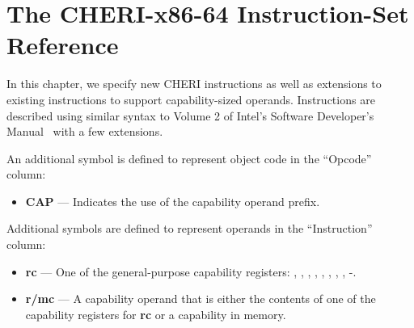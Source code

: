 \chapter{The CHERI-x86-64 Instruction-Set Reference}
\label{chap:isaref-x86-64}


\newenvironment{x86opcodetable}{%
  \tabularx{\textwidth}{| l | l | p{2.0em} | p{2.5em} | p{2.5em} | Z |} \hline
    \textbf{Opcode} & \textbf{Instruction} & \textbf{Op/ En} &
    \textbf{Cap Mode} & \textbf{64-bit Mode} & \textbf{Description}\\
    \hline
}{%
  \endtabularx
}

\newcommand{\xopcode}[6]{%
  #1 & #2 & #3 & #4 & #5 & #6\\
  \hline
}

\newenvironment{x86opentable}{%
  \bigskip
  \noindent
  \tabularx{\textwidth}{| c | Y | Y | Y | Y |}
    \multicolumn{5}{c}{\bfseries Instruction Operand Encoding}\\
    \hline
    Op/En & Operand 1 & Operand 2 & Operand 3 & Operand 4\\
    \hline
}{%
  \endtabularx
}

\newcommand{\xopen}[5]{%
  #1 & #2 & #3 & #4 & #5\\
  \hline
}

In this chapter, we specify new CHERI instructions as well as
extensions to existing instructions to support capability-sized
operands.  Instructions are described using similar syntax to Volume 2
of Intel's Software Developer's Manual~\cite{intel-sdm-vol2} with a
few extensions.

An additional symbol is defined to represent object code in the
``Opcode'' column:

\begin{itemize}
  \item \textbf{CAP} { }---{ } Indicates the use of the capability
    operand prefix.
\end{itemize}

Additional symbols are defined to represent operands in the
``Instruction'' column:

\begin{itemize}
  \item \textbf{rc} { }---{ } One of the general-purpose capability
    registers: \CAX{}, \CBX{}, \CCX{}, \CDX{}, \CDI{}, \CSI{}, \CBP{},
    \CSP{}, -.

  \item \textbf{r/mc} { }---{ } A capability operand that is either
    the contents of one of the capability registers for \textbf{rc} or
    a capability in memory.
\end{itemize}

